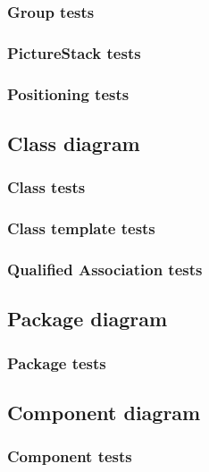   \subsubsection{Group tests}

  \subsubsection{PictureStack tests}

  \subsubsection{Positioning tests}

\subsection{Class diagram}
  \subsubsection{Class tests}
    
  \subsubsection{Class template tests}

  \subsubsection{Qualified Association tests}

\subsection{Package diagram}
\subsubsection{Package tests}

\subsection{Component diagram}
\subsubsection{Component tests}

